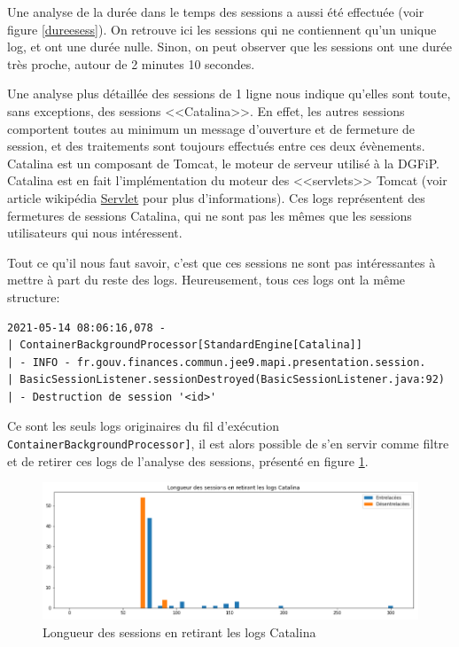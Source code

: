 \documentclass[openany, 11pt]{memoir}
\begin{document}
Une analyse de la durée dans le temps des sessions a aussi été effectuée (voir figure \ref{dureesess}). On retrouve ici les sessions qui ne contiennent qu'un unique \gls{log}, et ont une durée nulle. Sinon, on peut observer que les sessions ont une durée très proche, autour de 2 minutes 10 secondes.

\bigskip
Une analyse plus détaillée des sessions de 1 ligne nous indique qu'elles sont toute, sans exceptions, des sessions <<Catalina>>. En effet, les autres sessions comportent toutes au minimum un message d'ouverture et de fermeture de session, et des traitements sont toujours effectués entre ces deux évènements. Catalina est un composant de Tomcat, le moteur de serveur utilisé à la DGFiP. Catalina est en fait l'implémentation du moteur des <<servlets>> Tomcat (voir article wikipédia \href{https://fr.wikipedia.org/wiki/Servlet}{Servlet} pour plus d'informations). Ces \glspl{log} représentent des fermetures de sessions Catalina, qui ne sont pas les mêmes que les sessions utilisateurs qui nous intéressent.

Tout ce qu'il nous faut savoir, c'est que ces sessions ne sont pas intéressantes à mettre à part du reste des \glspl{log}. Heureusement, tous ces logs ont la même structure:

\begin{lstlisting}
2021-05-14 08:06:16,078 -
| ContainerBackgroundProcessor[StandardEngine[Catalina]]
| - INFO - fr.gouv.finances.commun.jee9.mapi.presentation.session.
| BasicSessionListener.sessionDestroyed(BasicSessionListener.java:92)
| - Destruction de session '<id>'
\end{lstlisting}

Ce sont les seuls \glspl{log} originaires du fil d'exécution \texttt{ContainerBackgroundProcessor\allowbreak [Stan\-dard\allowbreak Engine[Catalina]]}, il est alors possible de s'en servir comme filtre et de retirer ces logs de l'analyse des sessions, présenté en figure \ref{longsesscata}.

\begin{figure}[ht]
	\centering
	\includegraphics[width=\textwidth]{images/longsesscata.png}
	\caption{Longueur des sessions en retirant les logs Catalina}
	\label{longsesscata}
\end{figure}
\end{document}
